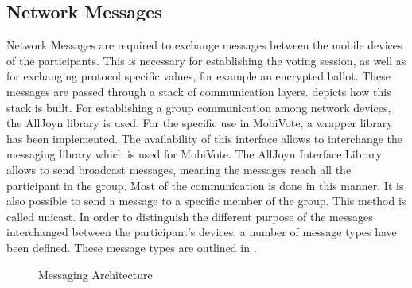 \documentclass[numbers=noenddot, abstract=on, a4paper, headsepline,
footsepline, oneside, draft=off]{scrreprt}
\begin{document}
\subsection{Network Messages}
Network Messages are required to exchange messages between the mobile devices of
the participants. This is necessary for establishing the voting session, as well
as for exchanging protocol specific values, for example an encrypted ballot.
These messages are passed through a stack of communication layers.
 depicts how this stack is built. For
establishing a group communication among network devices, the AllJoyn library is
used. For the specific use in MobiVote, a wrapper library has been implemented.
The availability of this interface allows to interchange the messaging library
which is used for MobiVote. The AllJoyn Interface Library allows to send
broadcast messages, meaning the messages reach all the participant in the group.
Most of the communication is done in this manner. It is also possible to send a
message to a specific member of the group. This method is called unicast. In
order to distinguish the different purpose of the messages interchanged between
the participant's devices, a number of message types have been defined. These
message types are outlined in .

 \begin{figure}[htbp]
	\centering
	\caption{Messaging Architecture}
	\label{fig:messagingarchitecture}
\end{figure}
\end{document}
